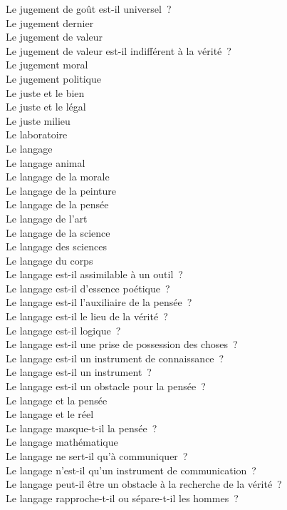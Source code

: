\documentclass[a4paper,12pt]{article}
\begin{document}
Le jugement de goût est-il universel ? \\
Le jugement dernier \\
Le jugement de valeur \\
Le jugement de valeur est-il indifférent à la vérité ? \\
Le jugement moral \\
Le jugement politique \\
Le juste et le bien \\
Le juste et le légal \\
Le juste milieu \\
Le laboratoire \\
Le langage \\
Le langage animal \\
Le langage de la morale \\
Le langage de la peinture \\
Le langage de la pensée \\
Le langage de l'art \\
Le langage de la science \\
Le langage des sciences \\
Le langage du corps \\
Le langage est-il assimilable à un outil ? \\
Le langage est-il d'essence poétique ? \\
Le langage est-il l'auxiliaire de la pensée ? \\
Le langage est-il le lieu de la vérité ? \\
Le langage est-il logique ? \\
Le langage est-il une prise de possession des choses ? \\
Le langage est-il un instrument de connaissance ? \\
Le langage est-il un instrument ? \\
Le langage est-il un obstacle pour la pensée ? \\
Le langage et la pensée \\
Le langage et le réel \\
Le langage masque-t-il la pensée ? \\
Le langage mathématique \\
Le langage ne sert-il qu'à communiquer ? \\
Le langage n'est-il qu'un instrument de communication ? \\
Le langage peut-il être un obstacle à la recherche de la vérité ? \\
Le langage rapproche-t-il ou sépare-t-il les hommes ? \\
\end{document}
